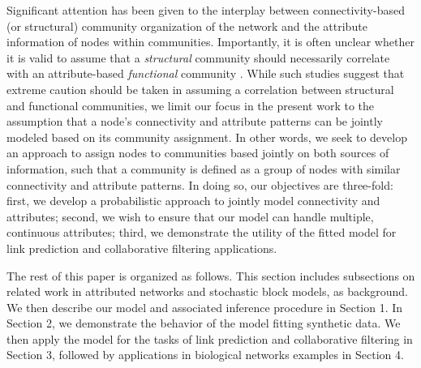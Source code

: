 Significant attention has been given to the interplay between connectivity-based (or structural) community organization of the network and the attribute information of nodes within communities. Importantly, it is often unclear whether it is valid to assume that a \emph{structural} community should necessarily correlate with an attribute-based \emph{functional} community \cite{hric,peel2017ground,jureGroundTruth}. While such studies suggest that extreme caution should be taken in assuming a correlation between structural and functional communities, we limit our focus in the present work to the assumption that a node's connectivity and attribute patterns can be jointly modeled based on its community assignment. In other words, we seek to develop an approach to assign nodes to communities based jointly on both sources of information, such that a community is defined as a group of nodes with similar connectivity and attribute patterns. In doing so, our objectives are three-fold: first, we develop a probabilistic approach to jointly model connectivity and attributes; second, we wish to ensure that our model can handle multiple, continuous attributes; third, we demonstrate the utility of the fitted model for link prediction and collaborative filtering applications.

The rest of this paper is organized as follows. This section includes subsections on related work in attributed networks and stochastic block models, as background. We then describe our model and associated inference procedure in Section 1. In Section 2, we demonstrate the behavior of the model fitting synthetic data. We then apply the model for the tasks of link prediction and collaborative filtering in Section 3, followed by applications in biological networks examples in Section 4.

